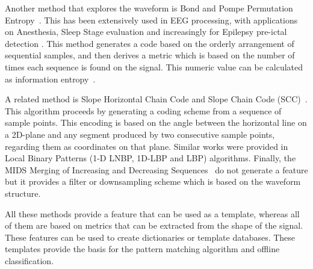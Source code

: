 Another method that explores the waveform is Bond and Pompe Permutation Entropy~\cite{Bandt2002}.  This has been extensively used in EEG processing, with applications on Anesthesia, Sleep Stage evaluation and increasingly for Epilepsy pre-ictal detection .  This method generates a code based on the orderly arrangement of sequential samples, and then derives a metric which is based on the number of times each sequence is found on the signal.  This numeric value can be calculated as information entropy~\cite{Nicolaou2010}.

A related method is Slope Horizontal Chain Code and Slope Chain Code (SCC)~\cite{Alvarado-Gonzalez2016}. This algorithm proceeds by generating a coding scheme from a sequence of sample points. This encoding is based on the angle between the horizontal line on a 2D-plane and any segment produced by two consecutive sample points, regarding them as coordinates on that plane.  Similar works were provided in Local Binary Patterns  (1-D LNBP, 1D-LBP and LBP)\cite{Jaiswal2017} algorithms.  Finally, the  MIDS Merging of Increasing and Decreasing Sequences~\cite{Zhang2013} do not generate a feature but it provides a filter or downsampling scheme which is based on the waveform structure.

%

All these methods provide a feature that can be used as a template, whereas all of them are based on metrics that can be extracted from the shape of the signal.  These features can be used to create dictionaries or template databases.  These templates provide the basis for the pattern matching algorithm and offline classification.



